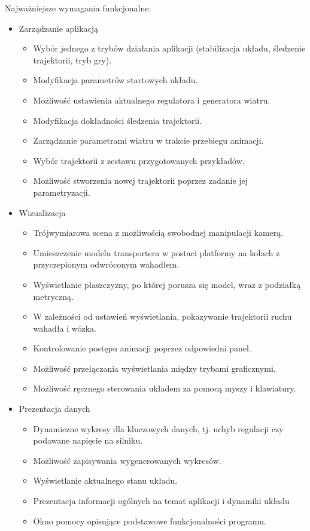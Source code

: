 \documentclass[12pt, oneside]{report}
\theoremstyle{definition}
\begin{document}
Najważniejsze wymagania funkcjonalne:
\begin{itemize}
\item Zarządzanie aplikacją
\begin{itemize}
\item Wybór jednego z trybów działania aplikacji (stabilizacja układu, śledzenie trajektorii, tryb gry).
\item Modyfikacja parametrów startowych układu.
\item Możliwość ustawienia aktualnego regulatora i generatora wiatru.
\item Modyfikacja dokładności śledzenia trajektorii.
\item Zarządzanie parametrami wiatru w trakcie przebiegu animacji.
\item Wybór trajektorii z zestawu przygotowanych przykładów.
\item Możliwość stworzenia nowej trajektorii poprzez zadanie jej parametryzacji.
\end{itemize}
\item Wizualizacja
\begin{itemize}
\item Trójwymiarowa scena z możliwością swobodnej manipulacji kamerą.
\item Umieszczenie modelu transportera w postaci platformy na kołach z przyczepionym odwróconym wahadłem.
\item Wyświetlanie płaszczyzny, po której porusza się model, wraz z podziałką metryczną. 
\item W zależności od ustawień wyświetlania, pokazywanie trajektorii ruchu wahadła i wózka.
\item Kontrolowanie postępu animacji poprzez odpowiedni panel.
\item Możliwość przełączania wyświetlania między trybami graficznymi.
\item Możliwość ręcznego sterowania układem za pomocą myszy i klawiatury.
\end{itemize}
\item Prezentacja danych
\begin{itemize}
\item Dynamiczne wykresy dla kluczowych danych, tj. uchyb regulacji czy podawane napięcie na silniku.
\item Możliwość zapisywania wygenerowanych wykresów.
\item Wyświetlanie aktualnego stanu układu.
\item Prezentacja informacji ogólnych na temat aplikacji i dynamiki układu
\item Okno pomocy opisujące podstawowe funkcjonalności programu.
\end{itemize}
\end{itemize}
\end{document}
